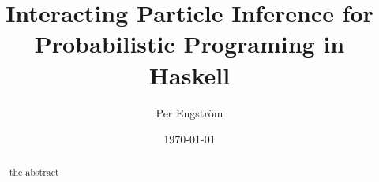 \documentclass[a4paper, twoside, twocolumn, html]{scrartcl}
\title{Interacting Particle Inference for Probabilistic Programing in Haskell}
\author{Per Engström}
\date{\today}
\begin{document}
\maketitle
\begin{abstract}
  the abstract
\end{abstract}








\end{document}
